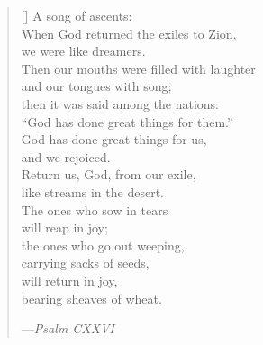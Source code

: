 \documentclass[a4paper,10pt,openany]{memoir}
\newcommand{\HgSource}[1]{\hfill{\small---\itshape{#1}}}
\begin{document}
\noindent
\begin{minipage}{.47\textwidth}
  \settowidth{\versewidth}{When God returned the exiles to Zion}
  \begin{verse}[\versewidth]
    A song of ascents: \\
    When God returned the exiles to Zion, \\
    \vin we were like dreamers. \\
    Then our mouths were filled with laughter \\
    \vin and our tongues with song; \\
    then it was said among the nations: \\
    \vin ``God has done great things for them.'' \\
    God has done great things for us, \\
    \vin and we rejoiced. \\
    Return us, God, from our exile, \\
    \vin like streams in the desert. \\
    The ones who sow in tears \\
    \vin will reap in joy; \\
    the ones who go out weeping, \\
    \vin carrying sacks of seeds, \\
    will return in joy, \\
    \vin bearing sheaves of wheat.

    \HgSource{Psalm CXXVI}
  \end{verse}
\end{minipage}
\hfill
\end{document}
